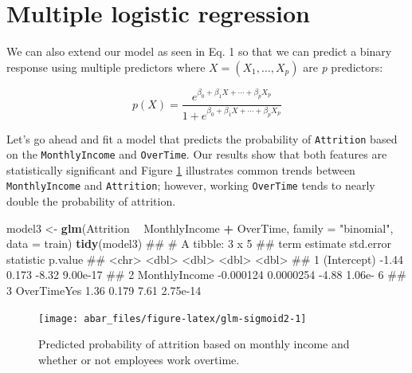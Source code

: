\documentclass[]{book}
\newenvironment{Shaded}{\begin{snugshade}}{\end{snugshade}}
\newcommand{\DataTypeTok}[1]{\textcolor[rgb]{0.13,0.29,0.53}{#1}}
\newcommand{\KeywordTok}[1]{\textcolor[rgb]{0.13,0.29,0.53}{\textbf{#1}}}
\newcommand{\NormalTok}[1]{#1}
\newcommand{\OperatorTok}[1]{\textcolor[rgb]{0.81,0.36,0.00}{\textbf{#1}}}
\newcommand{\StringTok}[1]{\textcolor[rgb]{0.31,0.60,0.02}{#1}}
\theoremstyle{definition}
\theoremstyle{definition}
\theoremstyle{definition}
\theoremstyle{remark}
\begin{document}
\hypertarget{multiple-logistic-regression}{%
\section{Multiple logistic
regression}\label{multiple-logistic-regression}}

We can also extend our model as seen in Eq. 1 so that we can predict a
binary response using multiple predictors where \(X = (X_1,\dots, X_p)\)
are \emph{p} predictors:

\begin{equation}
\label{eq:multi-logistic}
p(X) = \frac{e^{\beta_0 + \beta_1X + \cdots + \beta_pX_p }}{1 + e^{\beta_0 + \beta_1X + \cdots + \beta_pX_p}} 
\end{equation}

Let's go ahead and fit a model that predicts the probability of
\texttt{Attrition} based on the \texttt{MonthlyIncome} and
\texttt{OverTime}. Our results show that both features are statistically
significant and Figure \ref{fig:glm-sigmoid2} illustrates common trends
between \texttt{MonthlyIncome} and \texttt{Attrition}; however, working
\texttt{OverTime} tends to nearly double the probability of attrition.

\begin{Shaded}
\begin{Highlighting}[]
\NormalTok{model3 <-}\StringTok{ }\KeywordTok{glm}\NormalTok{(Attrition }\OperatorTok{~}\StringTok{ }\NormalTok{MonthlyIncome }\OperatorTok{+}\StringTok{ }\NormalTok{OverTime, }\DataTypeTok{family =} \StringTok{"binomial"}\NormalTok{, }\DataTypeTok{data =}\NormalTok{ train)}
\KeywordTok{tidy}\NormalTok{(model3)}
\NormalTok{## # A tibble: 3 x 5}
\NormalTok{##   term           estimate std.error statistic  p.value}
\NormalTok{##   <chr>             <dbl>     <dbl>     <dbl>    <dbl>}
\NormalTok{## 1 (Intercept)   -1.44     0.173         -8.32 9.00e-17}
\NormalTok{## 2 MonthlyIncome -0.000124 0.0000254     -4.88 1.06e- 6}
\NormalTok{## 3 OverTimeYes    1.36     0.179          7.61 2.75e-14}
\end{Highlighting}
\end{Shaded}

\begin{figure}

{\centering \texttt{[image: abar\_files/figure-latex/glm-sigmoid2-1]} 

}

\caption{Predicted probability of attrition based on monthly income and whether or not employees work overtime.}\label{fig:glm-sigmoid2}
\end{figure}
\end{document}
